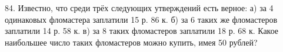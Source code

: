 84. Известно, что среди трёх следующих утверждений есть верное: а) за 4 одинаковых фломастера заплатили 15 р. 86 к. б) за 6 таких же фломастеров заплатили 14 р. 58 к. в) за 8 таких фломастеров заплатили 18 р. 68 к. Какое наибольшее число таких фломастеров можно купить, имея 50 рублей?\\
